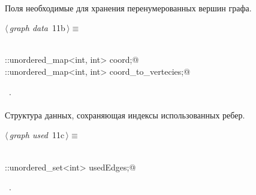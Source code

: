\documentclass[12pt]{article}
\begin{document}
\paragraph{}
Поля необходимые для хранения перенумерованных вершин графа.

\begin{flushleft} \small
\begin{minipage}{\linewidth}\label{scrap14}\raggedright\small
{} $\langle\,${\itshape graph data}\nobreak\ {\footnotesize {11b}}$\,\rangle\equiv$
\vspace{-1ex}
\begin{list}{}{} \item
\mbox{}\verb@@\\
\mbox{}\verb@std::unordered_map<int, int> coord;@\\
\mbox{}\verb@std::unordered_map<int, int> coord_to_vertecies;@\\
\mbox{}\verb@@{\NWsep}
\end{list}
\vspace{-1.5ex}
\footnotesize
\begin{list}{}{\setlength{\itemsep}{-\parsep}\setlength{\itemindent}{-\leftmargin}}
\item \NWtxtMacroRefIn\ .

\item{}
\end{list}
\end{minipage}\vspace{4ex}
\end{flushleft}
\paragraph{}
Структура данных, сохраняющая индексы использованных ребер. 
\begin{flushleft} \small
\begin{minipage}{\linewidth}\label{scrap15}\raggedright\small
{} $\langle\,${\itshape graph used}\nobreak\ {\footnotesize {11c}}$\,\rangle\equiv$
\vspace{-1ex}
\begin{list}{}{} \item
\mbox{}\verb@@\\
\mbox{}\verb@std::unordered_set<int> usedEdges;@\\
\mbox{}\verb@@{\NWsep}
\end{list}
\vspace{-1.5ex}
\footnotesize
\begin{list}{}{\setlength{\itemsep}{-\parsep}\setlength{\itemindent}{-\leftmargin}}
\item \NWtxtMacroRefIn\ .

\item{}
\end{list}
\end{minipage}\vspace{4ex}
\end{flushleft}
\end{document}
